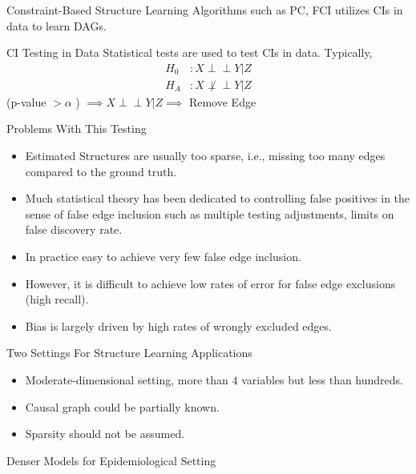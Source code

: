 \documentclass{beamer}
\def\ci{\perp\!\!\!\!\!\perp}
\begin{document}
\begin{frame}[t]{Constraint-Based Structure Learning}
	\center Algorithms such as PC, FCI utilizes CIs in data to learn DAGs.
\end{frame}

\begin{frame}{CI Testing in Data}
	Statistical tests are used to test CIs in data. Typically,
	\begin{equation*}
		\begin{split}
			H_0 &: X \ci Y \rvert Z \\
			H_A &: X \not \ci Y \rvert Z
		\end{split}
	\end{equation*}
	\vspace{2em}
	\center (p-value $ > \alpha $ ) $ \implies X \ci Y \rvert Z  \implies $ Remove Edge
\end{frame}

\begin{frame}{Problems With This Testing}
	\begin{itemize}
		\item Estimated Structures are usually too sparse, i.e., missing too many edges compared to the ground truth.
		\item Much statistical theory has been dedicated to controlling false positives in the sense of false edge inclusion such as multiple testing adjustments, limits on false discovery rate.
		\item In practice easy to achieve very few false edge inclusion.
		\item However, it is difficult to achieve low rates of error for false edge exclusions (high recall).
		\item Bias is largely driven by high rates of wrongly excluded edges.
	\end{itemize}
\end{frame}

\begin{frame}{Two Settings For Structure Learning Applications}
	\begin{itemize}
		\item Moderate-dimensional setting, more than $ 4 $ variables but less than hundreds.
		\item Causal graph could be partially known.
		\item Sparsity should not be assumed.
	\end{itemize}
\end{frame}

\begin{frame}{Denser Models for Epidemiological Setting}
\end{frame}
\end{document}
